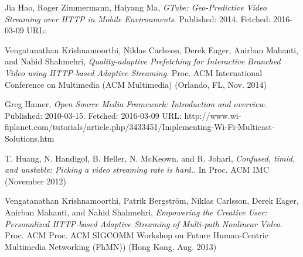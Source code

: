 \documentclass[9pt,a4paper]{acmproc}
\begin{document}
\clearpage
\begin{thebibliography}{9}

  Jia Hao, Roger Zimmermann, Haiyang Ma,
  \emph{GTube: Geo-Predictive Video Streaming over HTTP in Mobile Environments}.
  \newline
  Published: 2014. Fetched: 2016-03-09 
  \newline
	URL: 

  Vengatanathan Krishnamoorthi, Niklas Carlsson, Derek Eager, Anirban 
Mahanti, and Nahid Shahmehri,
  \emph{Quality-adaptive Prefetching for Interactive 
Branched Video using HTTP-based Adaptive Streaming}.
  \newline
  Proc. ACM 
International Conference on Multimedia (ACM Multimedia) (Orlando, FL, Nov. 
2014)

  Greg Hamer,
  \emph{Open Source Media Framework: Introduction and overview}.
  \newline
  Published: 2010-03-15. Fetched: 2016-03-09
 \newline
  URL: http://www.wi-fiplanet.com/tutorials/article.php/3433451/Implementing-Wi-Fi-Multicast-Solutions.htm
  
  T. Huang, N. Handigol, B. Heller, N. McKeown, and R. Johari,
  \emph{Confused, timid, and unstable: Picking a video streaming rate is hard.}.
  \newline
  In Proc. ACM IMC (November 2012)
  
  Vengatanathan Krishnamoorthi, Patrik Bergström, Niklas Carlsson, Derek 
Eager, Anirban Mahanti, and Nahid Shahmehri,
  \emph{Empowering the Creative User: 
Personalized HTTP-based Adaptive Streaming of Multi-path Nonlinear Video}.
  \newline
  Proc. ACM 
Proc. ACM SIGCOMM Workshop on Future Human-Centric Multimedia Networking 
(FhMN)) (Hong Kong, Aug. 2013)





\end{thebibliography}
\end{document}
